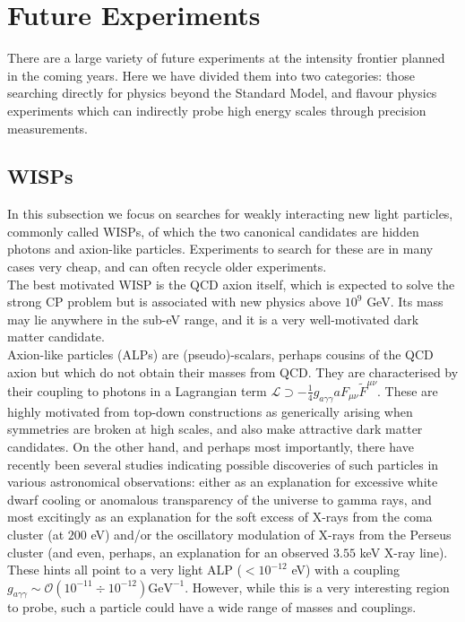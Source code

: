 
\section{Future Experiments}

There are a large variety of future experiments at the intensity frontier planned in the coming years. Here we have divided them into two categories: those searching directly for physics beyond the Standard Model, and flavour physics experiments which can indirectly probe high energy scales through precision measurements. 

\subsection{WISPs}

In this subsection we focus on searches for weakly interacting new light particles, commonly called WISPs, of which the two canonical candidates are hidden photons and axion-like particles. Experiments to search for these are in many cases very cheap, and can often recycle older experiments. \\


The best motivated WISP is the QCD axion itself, which is expected to solve the strong CP problem but is associated with new physics above $10^9$ GeV. Its mass may lie anywhere in the sub-eV range, and it is a very well-motivated dark matter candidate. \\


Axion-like particles (ALPs) are (pseudo)-scalars, perhaps cousins of the QCD axion but which do not obtain their masses from QCD. They are characterised by their coupling to photons in a Lagrangian term $\mathcal{L} \supset - \frac{1}{4} g_{a\gamma \gamma} a F_{\mu \nu} \tilde{F}^{\mu \nu}.$ These are highly motivated from top-down constructions as generically arising when symmetries are broken at high scales, and also make attractive dark matter candidates. On the other hand, and perhaps most importantly, there have recently been several studies indicating possible discoveries of such particles in various astronomical observations: either as an explanation for excessive white dwarf cooling or anomalous transparency of the universe to gamma rays, and most excitingly as an explanation for the soft excess of X-rays from the coma cluster (at $200$ eV) and/or the oscillatory modulation of X-rays from the Perseus cluster (and even, perhaps, an explanation for an observed $3.55$ keV X-ray line). These hints all point to a very light ALP ($< 10^{-12}$ eV) with a coupling $g_{a\gamma \gamma} \sim \mathcal{O}(10^{-11} \div 10^{-12}) \mathrm{GeV}^{-1}.$ However, while this is a very interesting region to probe, such a particle could have a wide range of masses and couplings. \\



